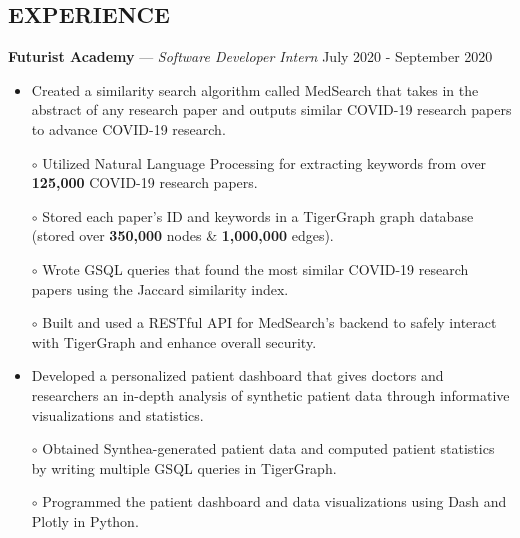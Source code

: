 \documentclass[11pt]{res}
\begin{document}
\begin{footnotesize}
\begin{resume}
\begin{small}
\section{EXPERIENCE}
\end{small}
\vspace{.5mm}
\textbf{Futurist Academy} — {\sl Software Developer Intern} \hfill July 2020 - September 2020\vspace{-5mm}
\begin{itemize}[leftmargin=6.25mm]
\item Created a similarity search algorithm called MedSearch that takes in the abstract of any research paper and outputs similar COVID-19 research papers to advance COVID-19 research.
\end{itemize}
\vspace{-6.4mm}
\begin{itemize} \itemsep -2pt 
\item[$\circ$] Utilized Natural Language Processing for extracting keywords from over \textbf{125,000} COVID-19 research papers.
\vspace{1mm}
\item[$\circ$] Stored each paper's ID and keywords in a TigerGraph graph database (stored over \textbf{350,000} nodes \& \textbf{1,000,000} edges).
\vspace{1mm}
\item[$\circ$] Wrote GSQL queries that found the most similar COVID-19 research papers using the Jaccard similarity index.
\vspace{1mm}
\item[$\circ$] Built and used a RESTful API for MedSearch's backend to safely interact with TigerGraph and enhance overall security.
\end{itemize}
\vspace{-6mm}
\begin{itemize}[leftmargin=6.25mm]
\item Developed a personalized patient dashboard that gives doctors and researchers an in-depth analysis of synthetic patient data through informative visualizations and statistics.
\end{itemize}
\vspace{-6.95mm}
\begin{itemize} \itemsep -2pt 
\item[$\circ$] Obtained Synthea-generated patient data and computed patient statistics by writing multiple GSQL queries in TigerGraph.
\vspace{1mm}
\item[$\circ$] Programmed the patient dashboard and data visualizations using Dash and Plotly in Python.

\end{itemize}
\end{resume}
\end{footnotesize}
\end{document}
